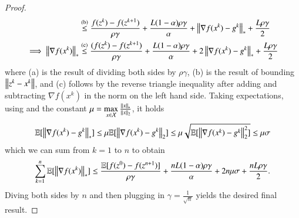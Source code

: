 \begin{toappendix}
\begin{proof}
\begin{equation}
\begin{aligned}
                &\stackrel{\text{(b)}}{\leq} \frac{f(z^k)-f(z^{k+1})}{\rho\gamma} + \frac{L(1-\alpha)\rho\gamma}{\alpha} + \left\Vert{\nabla f(x^k)-g^k}\right\Vert_{\ast} + \frac{L\rho\gamma}{2}\\
            \implies \left\Vert{\nabla f(x^k)}\right\Vert_{\ast}
                &\stackrel{\text{(c)}}{\leq} \frac{(f(z^k)-f(z^{k+1})}{\rho\gamma} + \frac{L(1-\alpha)\rho\gamma}{\alpha} + 2\left\Vert{\nabla f(x^k)-g^k}\right\Vert_{\ast} + \frac{L\rho\gamma}{2}
        \end{aligned}
    \end{equation}
    where (a) is the result of dividing both sides by $\rho\gamma$, (b) is the result of bounding $\left\Vert{z^k-x^k}\right\Vert$, and (c) follows by the reverse triangle inequality after adding and subtracting $\nabla f(x^k)$ in the norm on the left hand side.
    Taking expectations, using  and the constant $\mu = \max\limits_{x\in\mathcal{X}}\frac{\left\Vert{x}\right\Vert_{\ast}}{\left\Vert{x}\right\Vert_2}$, it holds
    \begin{equation*}
        \mathbb{E}[\left\Vert{\nabla f(x^k)-g^k}\right\Vert_{\ast}]\leq \mu\mathbb{E}[\left\Vert{\nabla f(x^k)-g^k}\right\Vert_{2}]\leq \mu\sqrt{\mathbb{E}[\left\Vert{\nabla f(x^k)-g^k}\right\Vert_{2}^2]}\leq \mu\sigma
    \end{equation*}
    which we can sum from $k=1$ to $n$ to obtain
    \begin{equation*}
        \sum\limits_{k=1}^n\mathbb{E}[\left\Vert{\nabla f(x^k)}\right\Vert_{\ast}] \leq \frac{\mathbb{E}[f(z^0)-f(z^{n+1})]}{\rho\gamma} + \frac{nL(1-\alpha)\rho\gamma}{\alpha} + 2n\mu\sigma + \frac{nL\rho\gamma}{2}.
    \end{equation*}
    Diving both sides by $n$ and then plugging in $\gamma = \frac{1}{\sqrt{n}}$ yields the desired final result.
\end{proof}


\end{toappendix}
